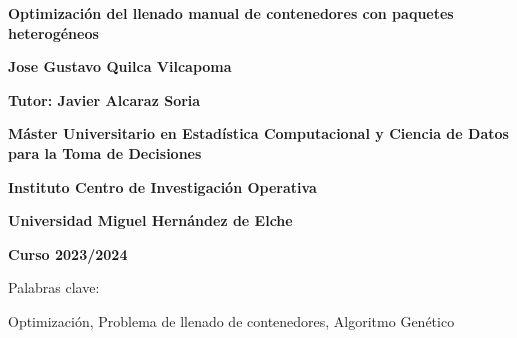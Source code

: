 \documentclass[openany]{article}
\begin{document}
\begin{titlepage}
    \newpage\thispagestyle{empty}

    {\flushleft \LARGE \bfseries Optimización del llenado manual de contenedores con paquetes heterogéneos \par} \vspace{1.5cm}

    {\flushleft \LARGE \bfseries Jose Gustavo Quilca Vilcapoma \par}\vspace{1cm}

    {\flushleft \Large \bfseries Tutor: Javier Alcaraz Soria \par}\vspace{1.5cm}

    {\flushleft \Large \bfseries Máster Universitario en Estadística Computacional y Ciencia de Datos para la Toma de Decisiones\par}\vspace{0.cm}
    {\flushleft \Large \bfseries Instituto Centro de Investigación Operativa\par}\vspace{0.cm}
    {\flushleft \Large \bfseries Universidad Miguel Hernández de Elche\par}\vspace{0.cm}
    {\flushleft \small \bfseries Curso 2023/2024\par}\vspace{1.5cm}

    {\flushleft \normalsize Palabras clave:\par}\vspace{0cm}

    {Optimización, Problema de llenado de contenedores, Algoritmo Genético \par}
    \vspace{1.5cm}

\end{titlepage}





\end{document}

